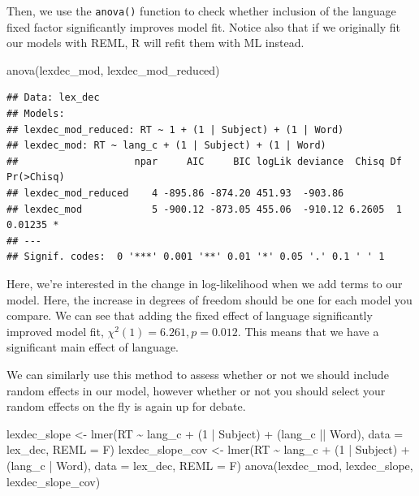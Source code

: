 \documentclass[
]{book}
\newenvironment{Shaded}{\begin{snugshade}}{\end{snugshade}}
\newcommand{\AttributeTok}[1]{\textcolor[rgb]{0.77,0.63,0.00}{#1}}
\newcommand{\DecValTok}[1]{\textcolor[rgb]{0.00,0.00,0.81}{#1}}
\newcommand{\FunctionTok}[1]{\textcolor[rgb]{0.00,0.00,0.00}{#1}}
\newcommand{\NormalTok}[1]{#1}
\newcommand{\OtherTok}[1]{\textcolor[rgb]{0.56,0.35,0.01}{#1}}
\newcommand{\SpecialCharTok}[1]{\textcolor[rgb]{0.00,0.00,0.00}{#1}}
\begin{document}
Then, we use the \texttt{anova()} function to check whether inclusion of the language fixed factor significantly improves model fit. Notice also that if we originally fit our models with REML, R will refit them with ML instead.

\begin{Shaded}
\begin{Highlighting}[]
\FunctionTok{anova}\NormalTok{(lexdec\_mod, lexdec\_mod\_reduced)}
\end{Highlighting}
\end{Shaded}

\begin{verbatim}
## Data: lex_dec
## Models:
## lexdec_mod_reduced: RT ~ 1 + (1 | Subject) + (1 | Word)
## lexdec_mod: RT ~ lang_c + (1 | Subject) + (1 | Word)
##                    npar     AIC     BIC logLik deviance  Chisq Df Pr(>Chisq)  
## lexdec_mod_reduced    4 -895.86 -874.20 451.93  -903.86                       
## lexdec_mod            5 -900.12 -873.05 455.06  -910.12 6.2605  1    0.01235 *
## ---
## Signif. codes:  0 '***' 0.001 '**' 0.01 '*' 0.05 '.' 0.1 ' ' 1
\end{verbatim}

Here, we're interested in the change in log-likelihood when we add terms to our model. Here, the increase in degrees of freedom should be one for each model you compare. We can see that adding the fixed effect of language significantly improved model fit, \(\chi^2(1) = 6.261, p = 0.012\). This means that we have a significant main effect of language.

We can similarly use this method to assess whether or not we should include random effects in our model, however whether or not you should select your random effects on the fly is again up for debate.

\begin{Shaded}
\begin{Highlighting}[]
\NormalTok{lexdec\_slope }\OtherTok{\textless{}{-}} \FunctionTok{lmer}\NormalTok{(RT }\SpecialCharTok{\textasciitilde{}}\NormalTok{ lang\_c }\SpecialCharTok{+}\NormalTok{ (}\DecValTok{1} \SpecialCharTok{|}\NormalTok{ Subject) }\SpecialCharTok{+}\NormalTok{ (lang\_c }\SpecialCharTok{||}\NormalTok{ Word), }\AttributeTok{data =}\NormalTok{ lex\_dec, }\AttributeTok{REML =}\NormalTok{ F)}
\NormalTok{lexdec\_slope\_cov }\OtherTok{\textless{}{-}} \FunctionTok{lmer}\NormalTok{(RT }\SpecialCharTok{\textasciitilde{}}\NormalTok{ lang\_c }\SpecialCharTok{+}\NormalTok{ (}\DecValTok{1} \SpecialCharTok{|}\NormalTok{ Subject) }\SpecialCharTok{+}\NormalTok{ (lang\_c }\SpecialCharTok{|}\NormalTok{ Word), }\AttributeTok{data =}\NormalTok{ lex\_dec, }\AttributeTok{REML =}\NormalTok{ F)}
\FunctionTok{anova}\NormalTok{(lexdec\_mod, lexdec\_slope, lexdec\_slope\_cov)}
\end{Highlighting}
\end{Shaded}
\end{document}
